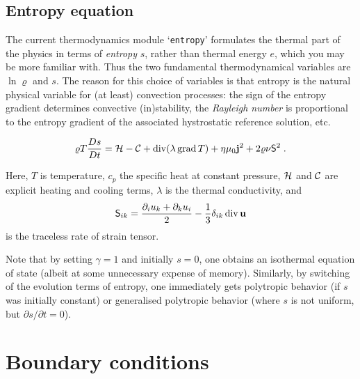 \documentclass[12pt,twoside,notitlepage,a4paper]{article}
\newcommand{\file}[1]{`\texttt{#1}'}
\newcommand{\grad}    {\mathop{\rm grad}\nolimits}
\newcommand{\Div}     {\mathop{\rm div}\nolimits}
\newcommand{\vekt}[1] {\mathbf{#1}}
\newcommand{\Cool}          {{\cal C}}
\newcommand{\Heat}          {{\cal H}}
\newcommand{\jv}            {\vekt{j}}
\newcommand{\uv}            {\vekt{u}}
\begin{document}

\subsection{Entropy equation}

The current thermodynamics module \file{entropy} formulates the thermal
part of the physics in terms of \emph{entropy} $s$, rather than thermal
energy $e$, which you may be more familiar with.
Thus the two fundamental thermodynamical variables are $\ln\varrho$
and $s$.
The reason for this choice of variables is that entropy is the natural
physical variable for (at least) convection processes: the sign of the
entropy gradient determines convective (in)stability, the
\emph{Rayleigh number} is proportional to the entropy gradient
of the associated hystrostatic reference solution, etc.

\begin{equation}
  \varrho T\frac{Ds}{Dt}
   =  \Heat - \Cool
      + \Div(\lambda\grad T)
      + \eta\mu_0 \jv^2
      + 2\varrho\nu {\sf S}^2 \; .
\end{equation}

Here, $T$ is temperature, $c_p$ the specific heat at constant pressure,
$\Heat$ and $\Cool$ are explicit heating and cooling terms,
$\lambda$ is the thermal conductivity, and
\begin{equation}
  {\sf S}_{ik} = \frac{\partial_i u_k + \partial_k u_i}{2}
                 -\frac{1}{3} \delta_{ik}\Div\uv
\end{equation}
is the traceless rate of strain tensor.

\bigskip

Note that by setting $\gamma=1$ and initially $s=0$, one obtains an
isothermal equation of state (albeit at some unnecessary expense of
memory).
Similarly, by switching of the evolution terms of entropy, one immediately
gets polytropic behavior (if $s$ was initially constant) or generalised
polytropic behavior
(where $s$ is not uniform, but $\partial s/\partial t = 0$).



\section{Boundary conditions}


\end{document}
